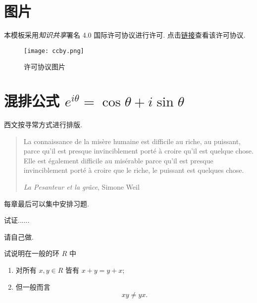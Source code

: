 	\section{图片}
	
	本模板采用\emph{知识共享}署名 4.0 国际许可协议进行许可. 点击\href{http://creativecommons.org/licenses/by/4.0/}{链接}查看该许可协议.
	\begin{figure}[h!]\begin{center}
		\texttt{[image: ccby.png]}
		\caption{许可协议图片}
	\end{center}\end{figure}

	\section{混排公式 \texorpdfstring{$e^{i\theta} = \cos\theta + i\sin\theta$}{exp itheta = cos theta + isin theta}}
	西文按寻常方式进行排版.
	\begin{quote}
		La connaissance de la misère humaine est difficile au riche, au puissant, parce qu'il est presque invinciblement porté à croire qu'il est quelque chose. Elle est également difficile au misérable parce qu'il est presque invinciblement porté à croire que le riche, le puissant est quelques chose.

		\begin{flushright}\textit{La Pesanteur et la grâce}, Simone Weil\end{flushright}
	\end{quote}

	每章最后可以集中安排习题.
	\begin{Exercises}
		\item 试证......
		\begin{hint}
			请自己做.
		\end{hint}
		\item 试说明在一般的环 $R$ 中
		\begin{enumerate}
			\item 对所有 $x, y \in R$ 皆有 $x + y = y + x$;
			\item 但一般而言
			\[ xy \neq yx. \]
		\end{enumerate}
	\end{Exercises}